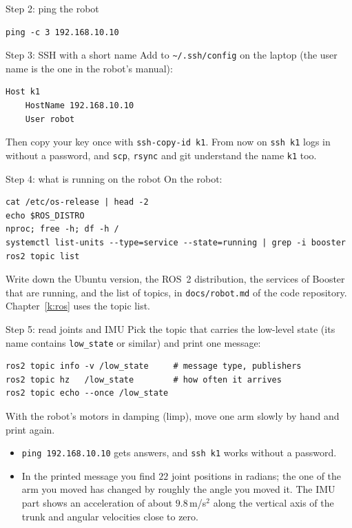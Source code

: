 \begin{stepbox}{Step 2: ping the robot}
\begin{verbatim}
ping -c 3 192.168.10.10
\end{verbatim}
\end{stepbox}

\begin{stepbox}{Step 3: SSH with a short name}
Add to \verb!~/.ssh/config! on the laptop (the user name is the one in the robot's manual\guess):
\begin{verbatim}
Host k1
    HostName 192.168.10.10
    User robot
\end{verbatim}
Then copy your key once with \verb!ssh-copy-id k1!. From now on \verb!ssh k1! logs in without a password, and \texttt{scp}, \texttt{rsync} and git understand the name \texttt{k1} too.
\end{stepbox}

\begin{stepbox}{Step 4: what is running on the robot}
On the robot:
\begin{verbatim}
cat /etc/os-release | head -2
echo $ROS_DISTRO
nproc; free -h; df -h /
systemctl list-units --type=service --state=running | grep -i booster
ros2 topic list
\end{verbatim}
Write down the Ubuntu version, the ROS~2 distribution, the services of Booster that are running, and the list of topics, in \texttt{docs/robot.md} of the code repository. Chapter~\ref{k:ros} uses the topic list.
\end{stepbox}

\begin{stepbox}{Step 5: read joints and IMU}
Pick the topic that carries the low-level state (its name contains \texttt{low\_state} or similar\guess) and print one message:
\begin{verbatim}
ros2 topic info -v /low_state     # message type, publishers
ros2 topic hz   /low_state        # how often it arrives
ros2 topic echo --once /low_state
\end{verbatim}
With the robot's motors in damping (limp), move one arm slowly by hand and print again.
\end{stepbox}

\begin{checkbox}
\begin{itemize}[nosep]
  \item \verb!ping 192.168.10.10! gets answers, and \verb!ssh k1! works without a password.
  \item In the printed message you find $22$ joint positions in radians; the one of the arm you moved has changed by roughly the angle you moved it. The IMU part shows an acceleration of about $9.8$\,m/s$^2$ along the vertical axis of the trunk and angular velocities close to zero.
\end{itemize}
\end{checkbox}

